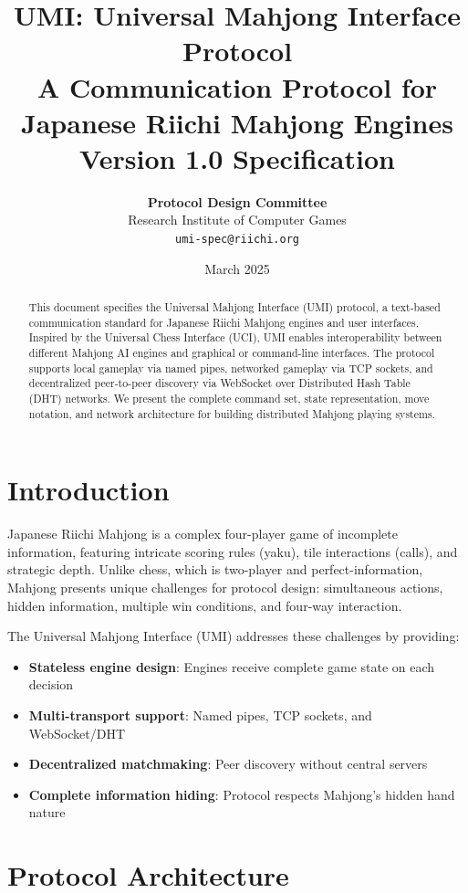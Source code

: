 \documentclass[11pt,a4paper]{article}
\title{\textbf{UMI: Universal Mahjong Interface Protocol}\\
\large A Communication Protocol for Japanese Riichi Mahjong Engines\\
Version 1.0 Specification}
\author{
    \textbf{Protocol Design Committee}\\
    Research Institute of Computer Games\\
    \texttt{umi-spec@riichi.org}
}
\date{March 2025}
\begin{document}
\maketitle

\begin{abstract}
This document specifies the Universal Mahjong Interface (UMI) protocol, a text-based communication standard for Japanese Riichi Mahjong engines and user interfaces. Inspired by the Universal Chess Interface (UCI), UMI enables interoperability between different Mahjong AI engines and graphical or command-line interfaces. The protocol supports local gameplay via named pipes, networked gameplay via TCP sockets, and decentralized peer-to-peer discovery via WebSocket over Distributed Hash Table (DHT) networks. We present the complete command set, state representation, move notation, and network architecture for building distributed Mahjong playing systems.
\end{abstract}

\section{Introduction}

Japanese Riichi Mahjong is a complex four-player game of incomplete information, featuring intricate scoring rules (yaku), tile interactions (calls), and strategic depth. Unlike chess, which is two-player and perfect-information, Mahjong presents unique challenges for protocol design: simultaneous actions, hidden information, multiple win conditions, and four-way interaction.

The Universal Mahjong Interface (UMI) addresses these challenges by providing:
\begin{itemize}
    \item \textbf{Stateless engine design}: Engines receive complete game state on each decision
    \item \textbf{Multi-transport support}: Named pipes, TCP sockets, and WebSocket/DHT
    \item \textbf{Decentralized matchmaking}: Peer discovery without central servers
    \item \textbf{Complete information hiding}: Protocol respects Mahjong's hidden hand nature
\end{itemize}

\section{Protocol Architecture}
\end{document}
